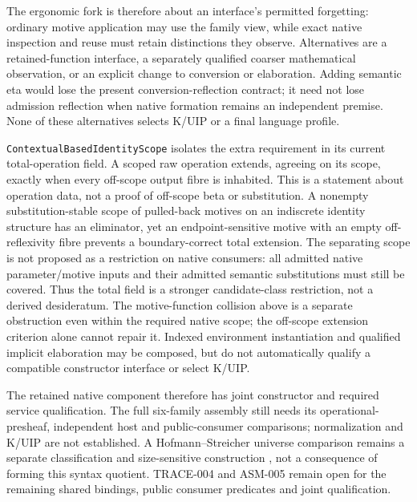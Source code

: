 \documentclass[11pt]{article}
\theoremstyle{definition}
\theoremstyle{remark}
\begin{document}
The ergonomic fork is therefore about an interface's permitted forgetting:
ordinary motive application may use the family view, while exact native
inspection and reuse must retain distinctions they observe. Alternatives
are a retained-function interface, a separately qualified coarser
mathematical observation, or an explicit change to conversion or elaboration.
Adding semantic eta would lose the present conversion-reflection contract;
it need not lose admission reflection when native formation remains an
independent premise. None of these alternatives selects K/UIP or a final
language profile.

\nolinkurl{ContextualBasedIdentityScope} isolates the extra requirement in its
current total-operation field. A scoped raw operation extends, agreeing on its
scope, exactly when every off-scope output fibre is inhabited. This is a
statement about operation data, not a proof of off-scope beta or substitution.
A nonempty substitution-stable scope of pulled-back motives on an indiscrete
identity structure has an eliminator, yet an endpoint-sensitive motive with an
empty off-reflexivity fibre prevents a boundary-correct total extension.
The separating scope is not proposed as a restriction on native consumers:
all admitted native parameter/motive inputs and their admitted semantic
substitutions must still be covered. Thus the total field is a stronger
candidate-class restriction, not a derived desideratum. The motive-function
collision above is a separate obstruction even within the required native
scope; the off-scope extension criterion alone cannot repair it. Indexed
environment instantiation and qualified implicit elaboration may be composed,
but do not automatically qualify a compatible constructor interface or
select K/UIP.

The retained native component therefore has joint constructor and required
service qualification. The full six-family assembly still needs its
operational-presheaf, independent host and public-consumer comparisons;
normalization and K/UIP are not established. A Hofmann--Streicher universe comparison remains a separate
classification and size-sensitive construction
\cite{AwodeyHofmannStreicherUniverses}, not a consequence of forming this
syntax quotient. TRACE-004 and ASM-005 remain open for the remaining shared
bindings, public consumer predicates and joint qualification.
\end{document}
